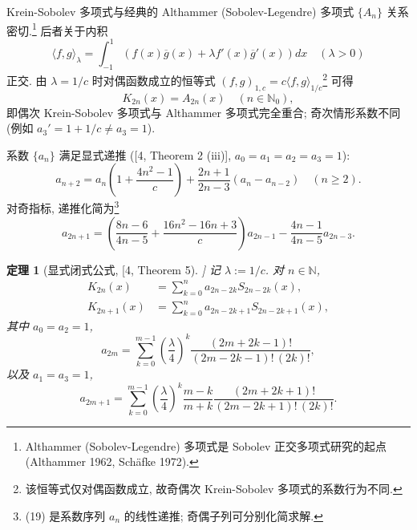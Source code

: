\documentclass[UTF8]{ctexart}
\newtheorem{theorem}{定理}[section]
\begin{document}
Krein-Sobolev 多项式与经典的 Althammer (Sobolev-Legendre) 多项式 $\{A_n\}$ 关系密切.\footnote{Althammer (Sobolev-Legendre) 多项式是 Sobolev 正交多项式研究的起点 (Althammer 1962, Sch\"afke 1972).}
后者关于内积
\begin{equation}
	\langle f, g \rangle_\lambda = \int_{-1}^{1} \left( f(x)\overline{g}(x)
		+ \lambda f'(x)\overline{g}'(x) \right) dx \quad (\lambda > 0)
\end{equation}
正交. 由 $\lambda = 1/c$ 时对偶函数成立的恒等式 $(f, g)_{1,c} = c \langle f, g \rangle_{1/c}$\footnote{该恒等式仅对偶函数成立, 故奇偶次 Krein-Sobolev 多项式的系数行为不同.}
可得
\begin{equation}
	K_{2n}(x) = A_{2n}(x) \quad (n \in \mathbb{N}_0),
\end{equation}
即偶次 Krein-Sobolev 多项式与 Althammer 多项式完全重合; 奇次情形系数不同
(例如 $a_3' = 1 + 1/c \neq a_3 = 1$).

系数 $\{a_n\}$ 满足显式递推 ([4, Theorem 2 (iii)], $a_0 = a_1 = a_2 = a_3 = 1$):
\begin{equation}
	a_{n+2} = a_n \left( 1 + \frac{4n^2 - 1}{c} \right)
		+ \frac{2n+1}{2n-3} (a_n - a_{n-2}) \quad (n \geq 2).
\end{equation}
对奇指标, 递推化简为\footnote{(19) 是系数序列 $a_n$ 的线性递推; 奇偶子列可分别化简求解.}
\begin{equation}
	a_{2n+1} = \left( \frac{8n-6}{4n-5} + \frac{16n^2 - 16n + 3}{c} \right) a_{2n-1}
		- \frac{4n-1}{4n-5} a_{2n-3}.
\end{equation}

\begin{theorem}[显式闭式公式, [4, Theorem 5]]
记 $\lambda := 1/c$. 对 $n \in \mathbb{N}$,
\begin{align}
	K_{2n}(x) &= \sum_{k=0}^{n} a_{2n-2k} S_{2n-2k}(x), \\
	K_{2n+1}(x) &= \sum_{k=0}^{n} a_{2n-2k+1} S_{2n-2k+1}(x),
\end{align}
其中 $a_0 = a_2 = 1$,
\begin{equation}
	a_{2m} = \sum_{k=0}^{m-1} \left( \frac{\lambda}{4} \right)^{k}
		\frac{(2m + 2k - 1)!}{(2m - 2k - 1)! \, (2k)!},
\end{equation}
以及 $a_1 = a_3 = 1$,
\begin{equation}
	a_{2m+1} = \sum_{k=0}^{m-1} \left( \frac{\lambda}{4} \right)^{k}
		\frac{m - k}{m + k}
		\frac{(2m + 2k + 1)!}{(2m - 2k + 1)! \, (2k)!}.
\end{equation}
\end{theorem}
\end{document}
